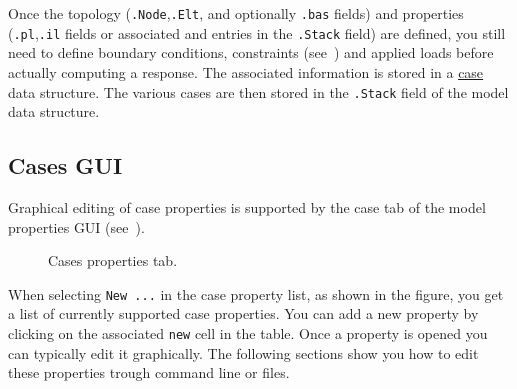 


Once the topology ({\tt .Node},{\tt .Elt}, and optionally {\tt .bas} fields) and properties ({\tt .pl},{\tt .il} fields or associated  and  entries in the {\tt .Stack} field) are defined, you still need to define boundary conditions, constraints (see~) and applied loads before actually computing a response. The associated information is stored in a \hyperlink{stackref}{case} data structure. The various cases are then stored in the {\tt .Stack} field of the model data structure.

\begin{SDT}
\subsection{Cases GUI}

Graphical editing of case properties is supported by the case tab of the model properties GUI (see~).

\begin{figure}[H]
\centering
{} %
 \caption{Cases properties tab.}
  \label{fig:feplot_case}
\end{figure}


When selecting {\tt New ...} in the case property list, as shown in the figure, you get a list of currently supported case properties. You can add a new property by clicking on the associated {\tt new} cell in the table. Once a property is opened you can typically edit it graphically. The following sections show you how to edit these properties trough command line or  files.
\end{SDT}


